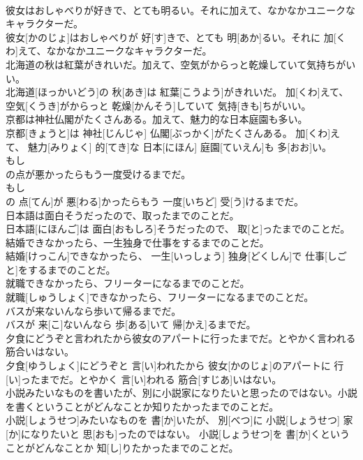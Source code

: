 \documentclass[8pt]{extreport}
\begin{document}
\begin{CJK}{UTF8}{min}
\\	彼女はおしゃべりが好きで、とても明るい。それに加えて、なかなかユニークなキャラクターだ。	
\\	彼女[かのじょ]はおしゃべりが 好[す]きで、とても 明[あか]るい。それに 加[くわ]えて、なかなかユニークなキャラクターだ。
\\	北海道の秋は紅葉がきれいだ。加えて、空気がからっと乾燥していて気持ちがいい。	
\\	北海道[ほっかいどう]の 秋[あき]は 紅葉[こうよう]がきれいだ。 加[くわ]えて、 空気[くうき]がからっと 乾燥[かんそう]していて 気持[きも]ちがいい。
\\	京都は神社仏閣がたくさんある。加えて、魅力的な日本庭園も多い。	
\\	京都[きょうと]は 神社[じんじゃ] 仏閣[ぶっかく]がたくさんある。 加[くわ]えて、 魅力[みりょく] 的[てき]な 日本[にほん] 庭園[ていえん]も 多[おお]い。
\\	もし
\\	の点が悪かったらもう一度受けるまでだ。	
\\	もし 
\\	の 点[てん]が 悪[わる]かったらもう 一度[いちど] 受[う]けるまでだ。
\\	日本語は面白そうだったので、取ったまでのことだ。	
\\	日本語[にほんご]は 面白[おもしろ]そうだったので、 取[と]ったまでのことだ。
\\	結婚できなかったら、一生独身で仕事をするまでのことだ。	
\\	結婚[けっこん]できなかったら、 一生[いっしょう] 独身[どくしん]で 仕事[しごと]をするまでのことだ。
\\	就職できなかったら、フリーターになるまでのことだ。	
\\	就職[しゅうしょく]できなかったら、フリーターになるまでのことだ。
\\	バスが来ないんなら歩いて帰るまでだ。	
\\	バスが 来[こ]ないんなら 歩[ある]いて 帰[かえ]るまでだ。
\\	夕食にどうぞと言われたから彼女のアパートに行ったまでだ。とやかく言われる筋合いはない。	
\\	夕食[ゆうしょく]にどうぞと 言[い]われたから 彼女[かのじょ]のアパートに 行[い]ったまでだ。とやかく 言[い]われる 筋合[すじあ]いはない。
\\	小説みたいなものを書いたが、別に小説家になりたいと思ったのではない。小説を書くということがどんなことか知りたかったまでのことだ。	
\\	小説[しょうせつ]みたいなものを 書[か]いたが、 別[べつ]に 小説[しょうせつ] 家[か]になりたいと 思[おも]ったのではない。 小説[しょうせつ]を 書[か]くということがどんなことか 知[し]りたかったまでのことだ。

\end{CJK}
\end{document}
